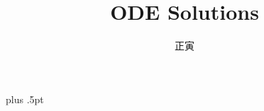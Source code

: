 \usepackage{graphicx}
\usepackage{wrapfig}
\usepackage{fancyhdr}
\usepackage{bm}
\usepackage{siunitx}

\newcommand\bmitPhi{\bm{\varPhi}}
\newcommand\bmitPsi{\bm{\varPsi}}
\newcommand\rmJ{\mathrm{J}}
\renewcommand{\contentsname}{目录}

\newtheorem{conclusion}{结论}


\let\leq=\leqslant
\let\geq=\geqslant

\lineskiplimit=2.5pt
\lineskip=2.5pt plus .5pt



\title{ODE Solutions}
\author{正寅}